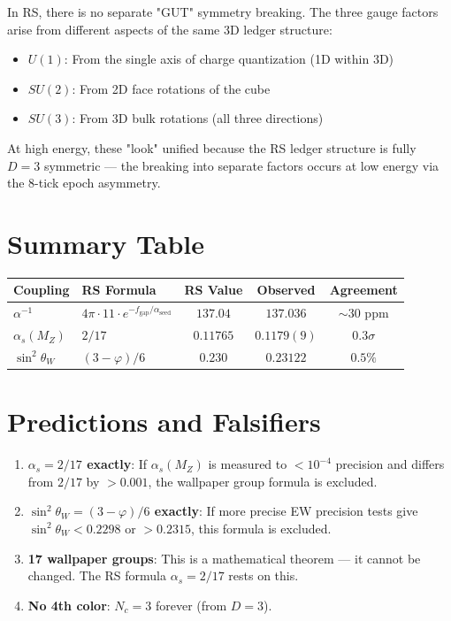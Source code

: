 \documentclass[12pt,a4paper]{article}
\theoremstyle{definition}
\theoremstyle{remark}
\begin{document}
In RS, there is no separate "GUT" symmetry breaking. The three gauge factors 
arise from different aspects of the same 3D ledger structure:
\begin{itemize}
\item $U(1)$: From the single axis of charge quantization (1D within 3D)
\item $SU(2)$: From 2D face rotations of the cube
\item $SU(3)$: From 3D bulk rotations (all three directions)
\end{itemize}

At high energy, these "look" unified because the RS ledger structure is fully 
$D=3$ symmetric — the breaking into separate factors occurs at low energy via 
the 8-tick epoch asymmetry.

\section{Summary Table}

\begin{center}
\begin{tabular}{|l|l|c|c|c|}
\hline
\textbf{Coupling} & \textbf{RS Formula} & \textbf{RS Value} & \textbf{Observed} & \textbf{Agreement} \\
\hline
$\alpha^{-1}$ & $4\pi \cdot 11 \cdot e^{-f_\mathrm{gap}/\alpha_\mathrm{seed}}$ & $137.04$ & $137.036$ & $\sim 30$ ppm \\
$\alpha_s(M_Z)$ & $2/17$ & $0.11765$ & $0.1179(9)$ & $0.3\sigma$ \\
$\sin^2\theta_W$ & $(3-\varphi)/6$ & $0.230$ & $0.23122$ & $0.5\%$ \\
\hline
\end{tabular}
\end{center}

\section{Predictions and Falsifiers}

\begin{enumerate}
\item \textbf{$\alpha_s = 2/17$ exactly}: If $\alpha_s(M_Z)$ is measured to $< 10^{-4}$ precision 
and differs from $2/17$ by $> 0.001$, the wallpaper group formula is excluded.

\item \textbf{$\sin^2\theta_W = (3-\varphi)/6$ exactly}: If more precise EW precision tests 
give $\sin^2\theta_W < 0.2298$ or $> 0.2315$, this formula is excluded.

\item \textbf{17 wallpaper groups}: This is a mathematical theorem — it cannot be changed. 
The RS formula $\alpha_s = 2/17$ rests on this.

\item \textbf{No 4th color}: $N_c = 3$ forever (from $D = 3$).
\end{enumerate}
\end{document}
